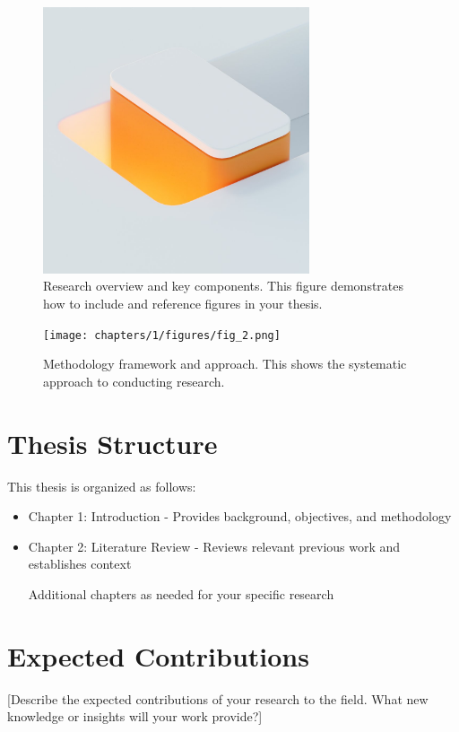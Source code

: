 \begin{figure}[h!tbp]
\centering
\includegraphics[width=0.7\textwidth]{chapters/1/figures/fig_1.png}
\caption{Research overview and key components. This figure demonstrates how to include and reference figures in your thesis.}
\label{fig:research_overview}
\end{figure}

\begin{figure}[h!tbp]
\centering
\texttt{[image: chapters/1/figures/fig\_2.png]}
\caption{Methodology framework and approach. This shows the systematic approach to conducting research.}
\label{fig:methodology}
\end{figure}

\section{Thesis Structure}
This thesis is organized as follows:
\begin{itemize}
\item Chapter 1: Introduction - Provides background, objectives, and methodology
\item Chapter 2: Literature Review - Reviews relevant previous work and establishes context
\item [Additional chapters as needed for your specific research]
\end{itemize}

\section{Expected Contributions}
[Describe the expected contributions of your research to the field. What new knowledge or insights will your work provide?]
